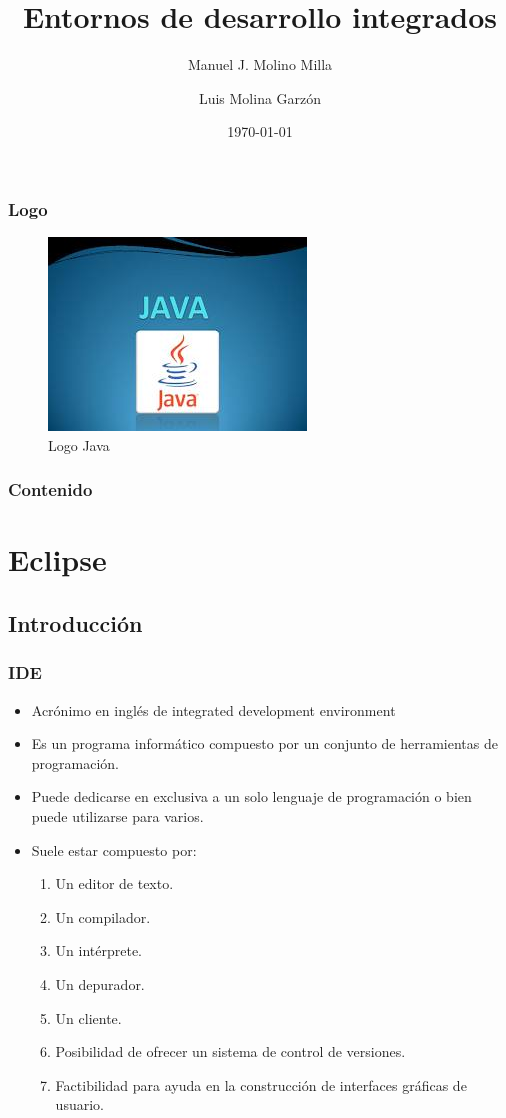 \documentclass{beamer}
\title{Entornos de desarrollo integrados}
\author{Manuel J. Molino Milla \and Luis Molina Garzón}
\date{\today} %
\institute{IES Virgen del Carmen \and Departamento de Informática}
\begin{document}
\begin{frame}
  \titlepage
\end{frame}

\begin{frame}
    \frametitle{Logo}
\begin{figure}
\includegraphics[scale=1]{imagenes/logo.jpeg} 
\caption{Logo Java}
\end{figure}
\end{frame}

\begin{frame}
  \frametitle{Contenido}
 \tableofcontents[pausesections]
\end{frame}

\section{Eclipse}
\subsection{Introducción}
\begin{frame}
\frametitle{IDE}
\begin{itemize}[<+->]
\item Acrónimo en inglés de integrated development environment
\item Es un programa informático compuesto por un conjunto de herramientas de programación. 
\item Puede dedicarse en exclusiva a un solo lenguaje de programación o bien puede utilizarse para varios.
\item Suele estar compuesto por:
\begin{enumerate}[<+->]
\item Un editor de texto.
\item Un compilador.
\item Un intérprete.
\item Un depurador.
\item Un cliente.
\item Posibilidad de ofrecer un sistema de control de versiones.
\item Factibilidad para ayuda en la construcción de interfaces gráficas de usuario.
\end{enumerate}
\end{itemize}
\end{frame}
\end{document}
